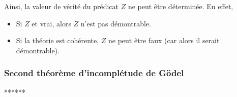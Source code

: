 Ainsi, la valeur de vérité du prédicat $Z$ ne peut être déterminée. 
En effet, 
\begin{itemize}[nosep]
    \item Si $Z$ et vrai, alors $Z$ n'est pas démontrable.
    \item Si la théorie est cohérente, $Z$ ne peut être faux (car alors il serait démontrable).
\end{itemize}

\subsubsection{Second théorème d'incomplétude de Gödel}

******
